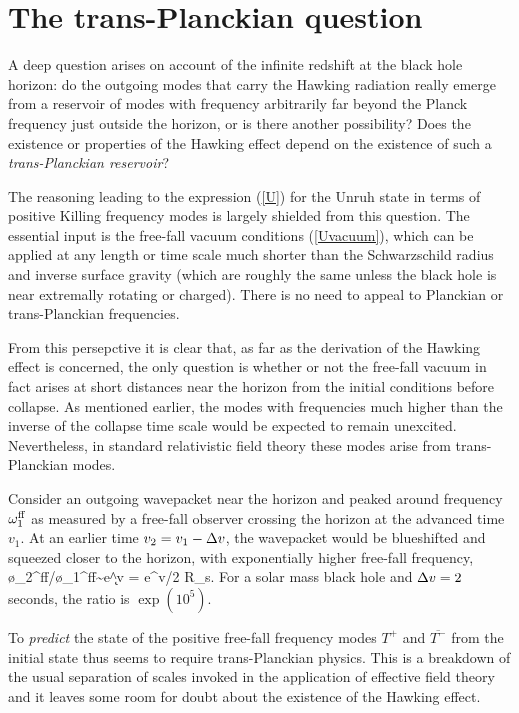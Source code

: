\documentclass[12pt]{article}
\newcommand{\sect}[1]{\section{#1}\setcounter{equation}{0}}
\begin{document}
\sect{The trans-Planckian question}
\label{tpq}

A deep question arises on account of the infinite redshift
at the black hole horizon: do the outgoing
modes that carry the Hawking radiation really 
emerge from a  reservoir of modes with frequency
arbitrarily far beyond the Planck frequency
just outside the horizon, or is there another possibility?
Does the existence or properties of the Hawking effect
depend on the existence of such a {\it trans-Planckian
reservoir}?

The reasoning leading to the expression (\ref{U})
for the Unruh state in terms of positive Killing frequency
modes is largely shielded from this question. The essential
input is the free-fall vacuum conditions (\ref{Uvacuum}),
which can be applied at any length or time scale much shorter
than the Schwarzschild radius and inverse surface gravity
(which are roughly the same unless the black hole is near 
extremally rotating or charged). There is no need to 
appeal to Planckian or trans-Planckian frequencies. 

From this persepctive it is clear that, as far as the
derivation of the Hawking effect
is concerned, the only question  is whether or not the
free-fall vacuum in fact arises at short distances near the
horizon from the initial conditions
before collapse. As mentioned earlier, the modes with 
frequencies much higher than the inverse of the collapse 
time scale would be expected to remain unexcited.
Nevertheless, in standard relativistic field theory these
modes arise from trans-Planckian modes. 

Consider an outgoing wavepacket near the horizon 
and peaked around frequency
$\omega_1^{\rm ff}$ as measured by a free-fall observer crossing the
horizon at the advanced time $v_1$. At an earlier time
$v_2=v_1-\Delta v$, 
the wavepacket would be blueshifted 
and squeezed closer to the horizon, 
with exponentially higher free-fall frequency, 
\beq
{\o_2^{\rm ff}}/{\o_1^{\rm ff}}\sim e^{\k \D v} = e^{\D v/2 R_s}.
\eeq
For a solar mass black hole and $\Delta v=2$ seconds, the ratio 
is $\exp(10^5)$.

To {\it predict} the state of the positive free-fall frequency modes
$T^+$ and $\overline{T^-}$ from the initial state thus seems to require trans-Planckian physics. This is a breakdown of the 
usual separation of scales invoked in the application of effective field theory and it leaves some room for doubt\cite{Jacobson:1991gr,Jacobson:1993hn,Helfer:2003va} 
about the existence of the Hawking effect. 
\end{document}
